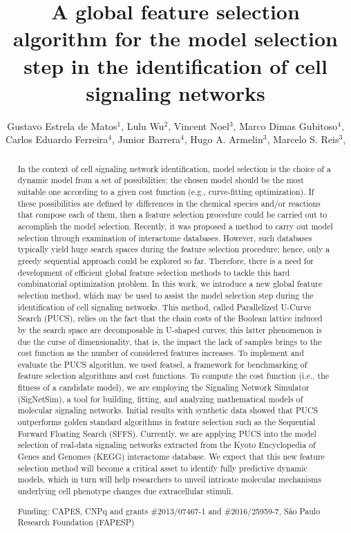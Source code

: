 \documentclass[twoside]{article}
\title{\vspace{-15mm}\fontsize{24pt}{10pt}\selectfont\textbf{ A global feature selection algorithm for the model selection step in the identification of cell signaling networks }} %
\author{ Gustavo Estrela de Matos$^{1}$, Lulu Wu$^{2}$, Vincent Noel$^{3}$, Marco Dimas Gubitoso$^{4}$, Carlos Eduardo Ferreira$^{4}$, Junior Barrera$^{4}$, Hugo A. Armelin$^{3}$, Marcelo S. Reis$^{3}$, }
\affil{ 1 Center of Toxins, Immune-response and Cell Signaling, Instituto Butantan, Instituto de Matemática e Estatística

2 Center of Toxins, Immune-response and Cell Signaling, Instituto Butantan

3 Instituto Butantan

4 Instituto de Matemática e Estatística, Universidade de São Paulo

 }
\date{}
\begin{document}
  
  
  \maketitle %
  
  
  \thispagestyle{fancy} %
  
  
  \begin{abstract}
  In the context of cell signaling network identification, model selection is the choice of a dynamic
model from a set of possibilities; the chosen model should be the most suitable one according to a
given cost function (e.g., curve-fitting optimization). If these possibilities are defined by differences
in the chemical species and/or reactions that compose each of them, then a feature selection
procedure could be carried out to accomplish the model selection. Recently, it was proposed a
method to carry out model selection through examination of interactome databases. However, such
databases typically yield huge search spaces during the feature selection procedure; hence, only a
greedy sequential approach could be explored so far. Therefore, there is a need for development of
efficient global feature selection methods to tackle this hard combinatorial optimization problem. In
this work, we introduce a new global feature selection method, which may be used to assist the
model selection step during the identification of cell signaling networks. This method, called
Parallelized U-Curve Search (PUCS), relies on the fact that the chain costs of the Boolean lattice
induced by the search space are decomposable in U-shaped curves; this latter phenomenon is due
the curse of dimensionality, that is, the impact the lack of samples brings to the cost function as the
number of considered features increases. To implement and evaluate the PUCS algorithm, we used
featsel, a framework for benchmarking of feature selection algorithms and cost functions. To
compute the cost function (i.e., the fitness of a candidate model), we are employing the Signaling
Network Simulator (SigNetSim), a tool for building, fitting, and analyzing mathematical models of
molecular signaling networks. Initial results with synthetic data showed that PUCS outperforms
golden standard algorithms in feature selection such as the Sequential Forward Floating Search
(SFFS). Currently, we are applying PUCS into the model selection of real-data signaling networks
extracted from the Kyoto Encyclopedia of Genes and Genomes (KEGG) interactome database. We
expect that this new feature selection method will become a critical asset to identify fully predictive
dynamic models, which in turn will help researchers to unveil intricate molecular mechanisms
underlying cell phenotype changes due extracellular stimuli.
  
  Funding: CAPES, CNPq and grants \#2013/07467-1 and \#2016/25959-7, S\~ao Paulo Research Foundation (FAPESP) \\ 
  \end{abstract}
  
\end{document}

